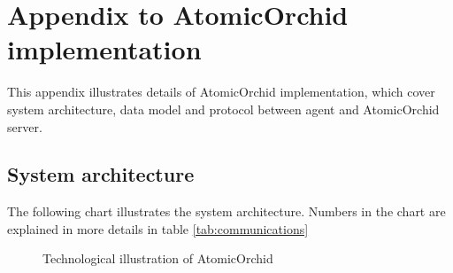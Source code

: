 \chapter{Appendix to AtomicOrchid implementation}
This appendix illustrates details of AtomicOrchid implementation, which cover system architecture, data model and protocol between agent and AtomicOrchid server.

\section{System architecture} \label{app:architecture}
The following chart illustrates the system architecture. Numbers in the chart are explained in more details in table \ref{tab:communications}
\begin{figure}[H]
  \centering
  \caption{Technological illustration of AtomicOrchid}
  \label{fig:systemDescription}
\end{figure}

